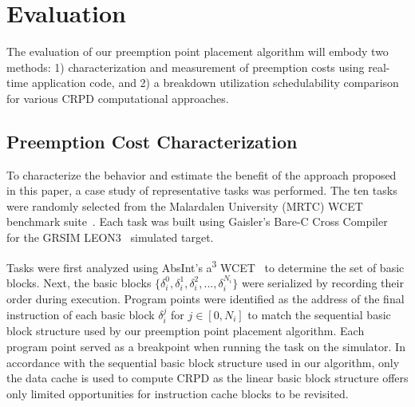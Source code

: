 \vspace{-15pt}
\section{Evaluation}\label{sec:evaluation}
The evaluation of our preemption point placement algorithm will embody
two methods: 1) characterization and measurement of preemption costs
using real-time application code, and 2) a breakdown utilization schedulability
comparison for various CRPD computational approaches.
\vspace{-10pt}
\subsection {Preemption Cost
  Characterization}\label{sec:preemption_cost_measurement}
To characterize the behavior and estimate the benefit of the approach
proposed in this paper, a case study of representative tasks was
performed. The ten tasks were randomly selected from the Malardalen University (MRTC) WCET benchmark suite~\cite{mrtc:01}. Each task was built using Gaisler's Bare-C Cross Compiler~\cite{gaisler:01} for the GRSIM LEON3~\cite{gaisler:02} simulated target.
%

Tasks were first analyzed using AbsInt's a\textsuperscript{3} WCET~\cite{absint:01}
to determine the set of basic blocks. Next, the basic blocks ${\{\delta_i^0, \delta_i^1, \delta_i^2, ..., \delta_i^{N_i}\}}$ were serialized by recording their order during execution. Program points were identified as the address of the final instruction of each basic block ${\delta_i^j}$ for $j \in [0, N_i]$ to match the sequential basic block structure used by our preemption point placement algorithm. Each program point served as a breakpoint when running the task on the simulator. In accordance with the sequential basic block structure used in our algorithm, only the data cache is used to compute CRPD as the linear basic block structure offers only limited opportunities for instruction cache blocks to be revisited.

